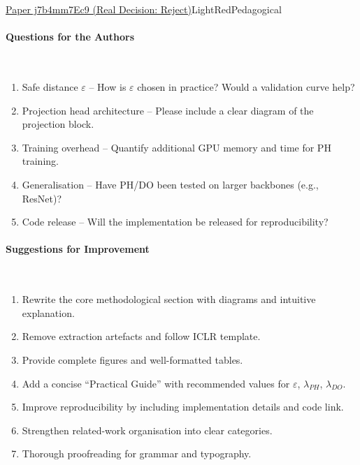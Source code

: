 \documentclass{article} %
\begin{document}
\begin{reviewbox}{\href{https://openreview.net/forum?id=j7b4mm7Ec9}{Paper j7b4mm7Ec9 (Real Decision: Reject)}}{LightRed}{Pedagogical}
\paragraph{Questions for the Authors}\leavevmode\\[0.1em]
\begin{enumerate}[leftmargin=0.5em, itemsep=0pt, topsep=0pt]
\item Safe distance $\varepsilon$ – How is $\varepsilon$ chosen in practice? Would a validation curve help?
\item Projection head architecture – Please include a clear diagram of the projection block.
\item Training overhead – Quantify additional GPU memory and time for PH training.
\item Generalisation – Have PH/DO been tested on larger backbones (e.g., ResNet)?
\item Code release – Will the implementation be released for reproducibility?
\end{enumerate}

\paragraph{Suggestions for Improvement}\leavevmode\\[0.1em]
\begin{enumerate}[leftmargin=0.5em, itemsep=0pt, topsep=0pt]
\item Rewrite the core methodological section with diagrams and intuitive explanation.
\item Remove extraction artefacts and follow ICLR template.
\item Provide complete figures and well-formatted tables.
\item Add a concise “Practical Guide” with recommended values for $\varepsilon$, $\lambda_{PH}$, $\lambda_{DO}$.
\item Improve reproducibility by including implementation details and code link.
\item Strengthen related-work organisation into clear categories.
\item Thorough proofreading for grammar and typography.
\end{enumerate}


\end{reviewbox}
\end{document}
